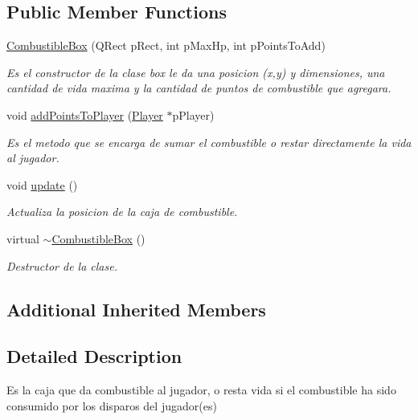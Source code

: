 \subsection*{Public Member Functions}
\begin{DoxyCompactItemize}
\item 
\hyperlink{class_combustible_box_abce0b8d39179a5fd5a0fd9076ab25b25}{Combustible\-Box} (Q\-Rect p\-Rect, int p\-Max\-Hp, int p\-Points\-To\-Add)
\begin{DoxyCompactList}\small\item\em Es el constructor de la clase box le da una posicion (x,y) y dimensiones, una cantidad de vida maxima y la cantidad de puntos de combustible que agregara. \end{DoxyCompactList}\item 
void \hyperlink{class_combustible_box_abab14feb7a19ee2a9fc61bbb1a92726a}{add\-Points\-To\-Player} (\hyperlink{class_player}{Player} $\ast$p\-Player)
\begin{DoxyCompactList}\small\item\em Es el metodo que se encarga de sumar el combustible o restar directamente la vida al jugador. \end{DoxyCompactList}\item 
void \hyperlink{class_combustible_box_ac3bcbb721576f4b00b0f2d7e48994657}{update} ()
\begin{DoxyCompactList}\small\item\em Actualiza la posicion de la caja de combustible. \end{DoxyCompactList}\item 
virtual \hyperlink{class_combustible_box_ae16e87f370101cfcd78e7bd763de4620}{$\sim$\-Combustible\-Box} ()
\begin{DoxyCompactList}\small\item\em Destructor de la clase. \end{DoxyCompactList}\end{DoxyCompactItemize}
\subsection*{Additional Inherited Members}


\subsection{Detailed Description}
Es la caja que da combustible al jugador, o resta vida si el combustible ha sido consumido por los disparos del jugador(es) 

